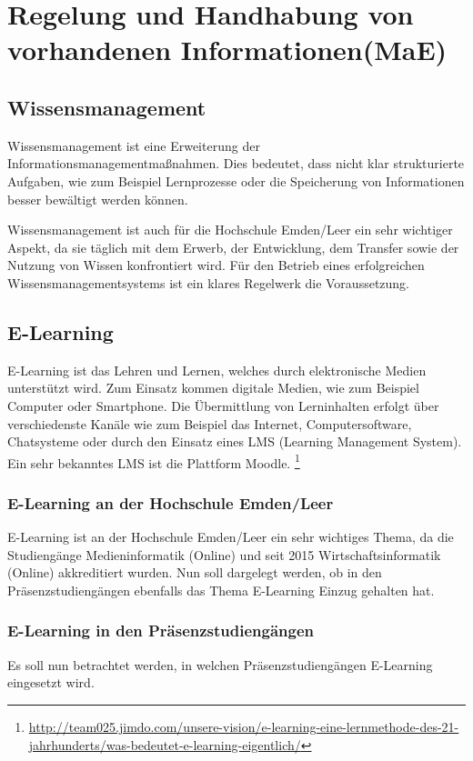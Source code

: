 \section{Regelung und Handhabung von vorhandenen Informationen(MaE)}

\subsection{Wissensmanagement}
Wissensmanagement ist eine Erweiterung der Informationsmanagementmaßnahmen. Dies bedeutet, dass nicht klar strukturierte Aufgaben, wie zum Beispiel Lernprozesse oder die Speicherung von Informationen besser bewältigt werden können. 

Wissensmanagement ist auch für die Hochschule Emden/Leer ein sehr wichtiger Aspekt, da sie täglich mit dem Erwerb, der Entwicklung, dem Transfer sowie der Nutzung von Wissen konfrontiert wird. Für den Betrieb eines erfolgreichen Wissensmanagementsystems ist ein klares Regelwerk die Voraussetzung. 

\subsection{E-Learning}
E-Learning ist das Lehren und Lernen, welches durch elektronische Medien unterstützt wird. Zum Einsatz kommen digitale Medien, wie zum Beispiel Computer oder Smartphone. Die Übermittlung von Lerninhalten erfolgt über verschiedenste Kanäle wie zum Beispiel das Internet, Computersoftware, Chatsysteme oder durch den Einsatz eines LMS (Learning Management System). Ein sehr bekanntes LMS ist die Plattform Moodle. \footnote{\url{http://team025.jimdo.com/unsere-vision/e-learning-eine-lernmethode-des-21-jahrhunderts/was-bedeutet-e-learning-eigentlich/}}

\subsubsection{E-Learning an der Hochschule Emden/Leer}
E-Learning ist an der Hochschule Emden/Leer ein sehr wichtiges Thema, da die Studiengänge Medieninformatik (Online) und seit 2015 Wirtschaftsinformatik (Online) akkreditiert  wurden. Nun soll dargelegt werden, ob in den Präsenzstudiengängen ebenfalls das Thema E-Learning Einzug gehalten hat.

\subsubsection{E-Learning in den Präsenzstudiengängen}
Es soll nun betrachtet werden, in welchen Präsenzstudiengängen E-Learning eingesetzt wird.

